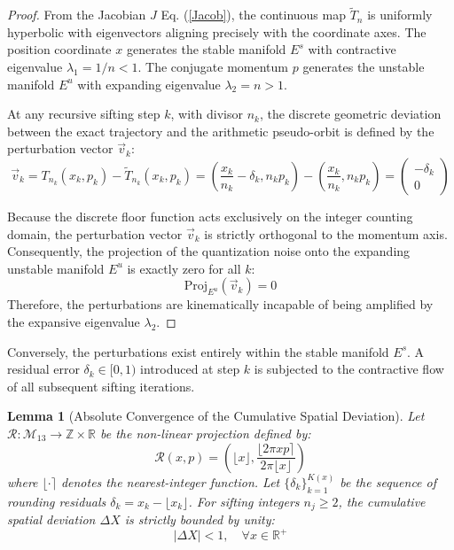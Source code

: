 \documentclass[sn-mathphys-num, pdflatex, referee]{sn-jnl}
\newtheorem{lemma}{Lemma}
\begin{document}
\begin{proof}
From the Jacobian $J$ Eq. (\ref{Jacob}), the continuous map $\tilde{T}_n$ is uniformly hyperbolic with eigenvectors aligning precisely with the coordinate axes. The position coordinate $x$ generates the stable manifold $E^s$ with contractive eigenvalue $\lambda_1 = 1/n < 1$. The conjugate momentum $p$ generates the unstable manifold $E^u$ with expanding eigenvalue $\lambda_2 = n > 1$.

At any recursive sifting step $k$, with divisor $n_k$, the discrete geometric deviation between the exact trajectory and the arithmetic pseudo-orbit is defined by the perturbation vector $\vec{v}_k$:
$$ \vec{v}_k = T_{n_k}(x_k, p_k) - \tilde{T}_{n_k}(x_k, p_k) = \left( \frac{x_k}{n_k} - \delta_k, n_k p_k \right) - \left( \frac{x_k}{n_k}, n_k p_k \right) = \begin{pmatrix} -\delta_k \\ 0 \end{pmatrix} $$

Because the discrete floor function acts exclusively on the integer counting domain, the perturbation vector $\vec{v}_k$ is strictly orthogonal to the momentum axis. Consequently, the projection of the quantization noise onto the expanding unstable manifold $E^u$ is exactly zero for all $k$:
$$ \text{Proj}_{E^u}(\vec{v}_k) = 0 $$
Therefore, the perturbations are kinematically incapable of being amplified by the expansive eigenvalue $\lambda_2$. 
\end{proof}
Conversely, the perturbations exist entirely within the stable manifold $E^s$. A residual error $\delta_k \in [0,1)$ introduced at step $k$ is subjected to the contractive flow of all subsequent sifting iterations. 
\begin{lemma}[Absolute Convergence of the Cumulative Spatial Deviation]
\label{lem:delta_x_bound}
Let $\mathcal{R}: \mathcal{M}_{13} \to \mathbb{Z} \times \mathbb{R}$ be the non-linear projection defined by:
\begin{equation}
\label{R}
\mathcal{R}(x, p) = \left( \lfloor x \rfloor, \frac{\lfloor 2\pi xp \rceil}{2\pi \lfloor x \rfloor} \right)
\end{equation}
where $\lfloor \cdot \rceil$ denotes the nearest-integer function. Let $\{\delta_k\}_{k=1}^{K(x)}$ be the sequence of rounding residuals $\delta_k = x_k - \lfloor x_k \rfloor$. For sifting integers $n_j \ge 2$, the cumulative spatial deviation $\Delta X$ is strictly bounded by unity:
\begin{equation}
|\Delta X| < 1, \quad \forall x \in \mathbb{R}^+
\end{equation}
\end{lemma}
\end{document}
